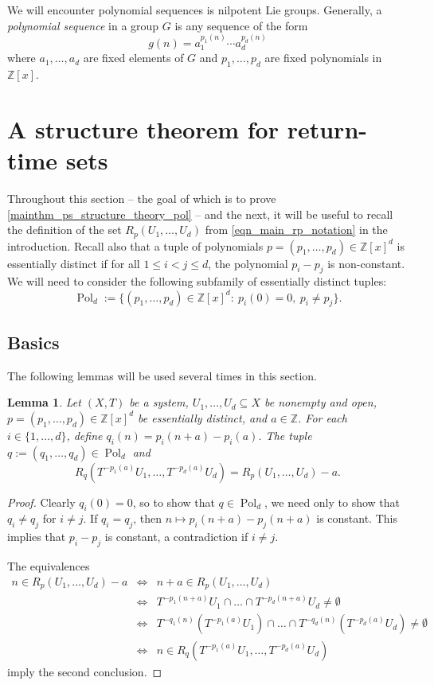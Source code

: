 \documentclass{article}
\theoremstyle{plain}
\newtheorem{lemma}[Theorem]{Lemma}
\theoremstyle{claim}
\theoremstyle{definition}
\theoremstyle{plain}
\theoremstyle{plain}
\newcommand{\Z}{\mathbb{Z}}
\newcommand{\Pol}{\operatorname{Pol}}
\renewcommand{\leq}{\leqslant}
\newcommand{\1}{\boldsymbol{1}}
\begin{document}
We will encounter polynomial sequences is nilpotent Lie groups.  Generally, a \emph{polynomial sequence} in a group $G$ is any sequence of the form
\[
g(n) = a_1^{p_1(n)} \cdots a_d^{p_d(n)}
\]
where $a_1,\dots,a_d$ are fixed elements of $G$ and $p_1,\dots,p_d$ are fixed polynomials in $\Z[x]$.

\section{A structure theorem for return-time sets}
\label{sec_poly_ps_structure}

Throughout this section -- the goal of which is to prove \cref{mainthm_ps_structure_theory_pol} -- and the next, it will be useful to recall the definition of the set $R_p(U_1,\ldots,U_d)$ from \eqref{eqn_main_rp_notation} in the introduction.  Recall also that a tuple of polynomials $p = (p_1, \ldots, p_d) \in \Z[x]^d$ is essentially distinct if for all $1 \leq i < j \leq d$, the polynomial $p_i - p_j$ is non-constant.  We will need to consider the following subfamily of essentially distinct tuples:
\[\Pol_d:=\Big\{(p_1,\dots,p_d)\in\Z[x]^{d}: \ p_i(0)=0, \ p_i\neq p_j\Big\}.\]

\subsection{Basics}

The following lemmas will be used several times in this section.
\begin{lemma}
\label{lem_translated_poly_returns}
    Let $(X,T)$ be a system, $U_1, \ldots, U_d \subseteq X$ be nonempty and open, $p=(p_1,\dots,p_d) \in \Z[x]^d$ be essentially distinct, and $a \in \Z$.  For each $i \in \{1, \ldots, d\}$, define $q_i(n) =  p_i(n + a) - p_i(a)$.  The tuple $q:=(q_1,\dots,q_d) \in \Pol_d$ and
    \[
        R_q(T^{-p_1(a)}U_1, \ldots, T^{-p_d(a)}U_d) = R_p(U_1, \ldots, U_d) - a.
    \]
\end{lemma}

\begin{proof}
Clearly $q_i(0) = 0$, so to show that $q \in \Pol_d$, we need only to show that $q_i \neq q_j$ for $i \neq j$.  
If $q_i=q_j$, then $n \mapsto p_i(n+a) - p_j(n+a)$ is constant. 
This implies that $p_i-p_j$ is constant, a contradiction if $i \neq j$.

The equivalences
\begin{eqnarray*}
n \in R_p(U_1, \ldots, U_d)-a 
 &\Longleftrightarrow& n+a \in R_p(U_1, \ldots, U_d)\\
 &\Longleftrightarrow& T^{-p_1(n+a)}U_1\cap\ldots\cap T^{-p_d(n+a)}U_d\neq \emptyset\\
 &\Longleftrightarrow& T^{-q_1(n)}(T^{-p_1(a)} U_1)\cap\ldots\cap T^{-q_d(n)}(T^{-p_d(a)} U_d)\neq \emptyset\\
 &\Longleftrightarrow& n\in R_q(T^{-p_1(a)}U_1,\ldots, T^{-p_d(a)}U_d)
\end{eqnarray*}
imply the second conclusion.
\end{proof}
\end{document}
